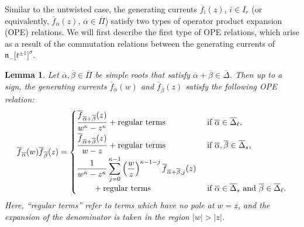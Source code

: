\documentclass[10pt,a4paper]{amsart}
\numberwithin{equation}{section}
\newtheorem{Lemma}[Theorem]{Lemma}
\begin{document}
Similar to the untwisted case, the generating currents $\overline{f}_i(z)$, $i\in I_r$ (or equivalently, $\overline{f}_{\overline{\alpha}}(z)$, $\overline{\alpha}\in \overline{\Pi}$) satisfy two types of operator product expansion (OPE) relations. We will first describe the first type of OPE relations, which arise as a result of the commutation relations between the generating currents of $\mathfrak{n}_-\bigl[t^{\pm1}\bigr]^{\sigma}$.

\begin{Lemma}\label{3.2}
Let $\overline{\alpha},\overline{\beta}\in\overline{\Pi}$ be simple roots that satisfy $\overline{\alpha}+\overline{\beta} \in\overline{\Delta}$. Then up to a sign, the generating currents $\overline{f}_{\overline{\alpha}}(w)$ and $\overline{f}_{\overline{\beta}}(z)$ satisfy the following OPE relation:
\begin{gather}
\overline{f}_{\overline{\alpha}}(w) \overline{f}_{\overline{\beta}}(z)=
\begin{cases}
\dfrac{\overline{f}_{\overline{\alpha}+\overline{\beta}}(z)}{w^{\kappa}-z^{\kappa}}+\text{regular terms} & \text{ if }\overline{\alpha}\in \overline{\Delta}_{\ell},\vspace{1mm}\\
\dfrac{\overline{f}_{\overline{\alpha}+\overline{\beta}}(z)}{w-z}+\text{regular terms} & \text{ if } \overline{\alpha},\overline{\beta}\in\overline{\Delta}_s,\vspace{1mm}\\
\displaystyle \dfrac{1}{w^{\kappa}-z^{\kappa}}\sum_{j=0}^{\kappa-1}\left(\frac{w}{z}\right)^{\kappa-1-j} \overline{f}_{\overline{\alpha}
+\overline{\beta},j}(z)&\\
\qquad {}+\text{regular terms} & \text{ if }\overline{\alpha}\in \overline{\Delta}_s\text{ and }\overline{\beta}\in \overline{\Delta}_{\ell}.
\end{cases}\label{eq:3.12}
\end{gather}
Here, ``regular terms'' refer to terms which have no pole at $w=z$, and the expansion of the denominator is taken in the region $|w|>|z|$.
\end{Lemma}
\end{document}
